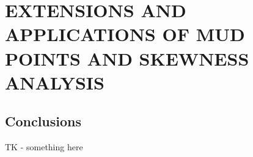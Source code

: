 \chapter{\uppercase{Extensions and Applications of MUD Points and Skewness Analysis} \label{chapter:vector-valued}}



\FloatBarrier

\section{Conclusions}

TK - something here
